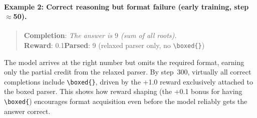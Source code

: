 \documentclass[11pt]{article}
\newcommand{\boxedcmd}{\texttt{\textbackslash boxed\{\}}}
\begin{document}
\paragraph{Example 2: Correct reasoning but format failure (early training, step $\approx$50).}
\begin{quote}
\textbf{Completion}: \textit{The answer is $9$ (sum of all roots).}\\[0.3em]
\textbf{Reward}: 0.1\quad\textbf{Parsed}: 9 (relaxed parser only, no \boxedcmd{})
\end{quote}
The model arrives at the right number but omits the required format, earning only the
partial credit from the relaxed parser.
By step~300, virtually all correct completions include \boxedcmd{}, driven by the +1.0
reward exclusively attached to the boxed parser.
This shows how reward shaping (the +0.1 bonus for having \texttt{\textbackslash boxed\{})
encourages format acquisition even before the model reliably gets the answer correct.
\end{document}
